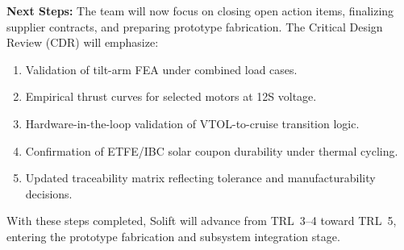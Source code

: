 \noindent \textbf{Next Steps:}  
The team will now focus on closing open action items, finalizing supplier contracts, and preparing prototype fabrication. The Critical Design Review (CDR) will emphasize:
\begin{enumerate}[noitemsep]
    \item Validation of tilt-arm FEA under combined load cases.
    \item Empirical thrust curves for selected motors at 12S voltage.
    \item Hardware-in-the-loop validation of VTOL-to-cruise transition logic.
    \item Confirmation of ETFE/IBC solar coupon durability under thermal cycling.
    \item Updated traceability matrix reflecting tolerance and manufacturability decisions.
\end{enumerate}

\noindent With these steps completed, Solift will advance from TRL~3--4 toward TRL~5, entering the prototype fabrication and subsystem integration stage.
